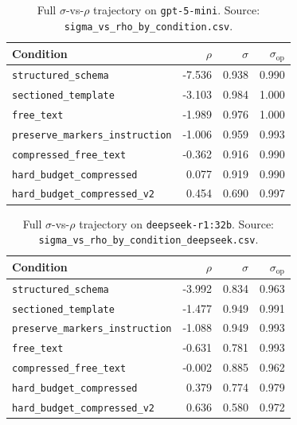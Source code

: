 \begin{table}[h]
\centering
\caption{Full $\sigma$-vs-$\rho$ trajectory on \texttt{gpt-5-mini}. Source: \texttt{sigma\_vs\_rho\_by\_condition.csv}.}
\label{tab:app_e2_rho_gpt}
\small
\begin{tabular}{@{}lrrr@{}}
\toprule
\textbf{Condition} & \boldmath$\rho$ & \boldmath$\sigma$ & \boldmath$\sigma_{\mathrm{op}}$ \\
\midrule
\texttt{structured\_schema}             & -7.536 & 0.938 & 0.990 \\
\texttt{sectioned\_template}            & -3.103 & 0.984 & 1.000 \\
\texttt{free\_text}                     & -1.989 & 0.976 & 1.000 \\
\texttt{preserve\_markers\_instruction} & -1.006 & 0.959 & 0.993 \\
\texttt{compressed\_free\_text}         & -0.362 & 0.916 & 0.990 \\
\texttt{hard\_budget\_compressed}       &  0.077 & 0.919 & 0.990 \\
\texttt{hard\_budget\_compressed\_v2}   &  0.454 & 0.690 & 0.997 \\
\bottomrule
\end{tabular}
\end{table}

\begin{table}[h]
\centering
\caption{Full $\sigma$-vs-$\rho$ trajectory on \texttt{deepseek-r1:32b}. Source: \texttt{sigma\_vs\_rho\_by\_condition\_deepseek.csv}.}
\label{tab:app_e2_rho_ds}
\small
\begin{tabular}{@{}lrrr@{}}
\toprule
\textbf{Condition} & \boldmath$\rho$ & \boldmath$\sigma$ & \boldmath$\sigma_{\mathrm{op}}$ \\
\midrule
\texttt{structured\_schema}             & -3.992 & 0.834 & 0.963 \\
\texttt{sectioned\_template}            & -1.477 & 0.949 & 0.991 \\
\texttt{preserve\_markers\_instruction} & -1.088 & 0.949 & 0.993 \\
\texttt{free\_text}                     & -0.631 & 0.781 & 0.993 \\
\texttt{compressed\_free\_text}         & -0.002 & 0.885 & 0.962 \\
\texttt{hard\_budget\_compressed}       &  0.379 & 0.774 & 0.979 \\
\texttt{hard\_budget\_compressed\_v2}   &  0.636 & 0.580 & 0.972 \\
\bottomrule
\end{tabular}
\end{table}

